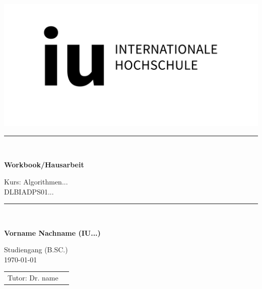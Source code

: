\def\usesf{}
\newcommand{\HRule}{\rule{\linewidth}{0.1mm}} %

\setlength{\unitlength}{1pt}

\begin{titlepage}

\vspace{-39pt}\hspace*{300pt}\includegraphics[width=.21\paperwidth]{resources/IU_Logo.png}

\begin{center}
\hbox{}
\vfill
{\usesf}

\HRule \\[0.4cm]
{\huge\bfseries Workbook/Hausarbeit \par}
Kurs: Algorithmen...\\[2mm]
DLBIADPS01...\\
\HRule \\[0.4cm]
\vskip 1cm


{\large\bfseries Vorname Nachname (IU...)\\}

Studiengang (B.SC.) \\
\today %
\vskip 6cm
\begin{tabular}{p{5cm}l}
Tutor: Dr. name \\
\end{tabular}
\vfill
\end{center}


\end{titlepage}
